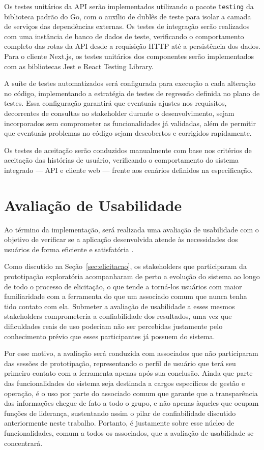 Os testes unitários da API serão implementados utilizando o pacote \texttt{testing} da biblioteca padrão do Go, com o auxílio de dublês de teste para isolar a camada de serviços das dependências externas. Os testes de integração serão realizados com uma instância de banco de dados de teste, verificando o comportamento completo das rotas da API desde a requisição HTTP até a persistência dos dados. Para o cliente Next.js, os testes unitários dos componentes serão implementados com as bibliotecas Jest e React Testing Library.

A suíte de testes automatizados será configurada para execução a cada alteração no código, implementando a estratégia de testes de regressão definida no plano de testes. Essa configuração garantirá que eventuais ajustes nos requisitos, decorrentes de consultas ao stakeholder durante o desenvolvimento, sejam incorporados sem comprometer as funcionalidades já validadas, além de permitir que eventuais problemas no código sejam descobertos e corrigidos rapidamente.

Os testes de aceitação serão conduzidos manualmente com base nos critérios de aceitação das histórias de usuário, verificando o comportamento do sistema integrado — API e cliente web — frente aos cenários definidos na especificação.


\section{Avaliação de Usabilidade}
\label{sec:usabilidade}

Ao término da implementação, será realizada uma avaliação de usabilidade com o objetivo de verificar se a aplicação desenvolvida atende às necessidades dos usuários de forma eficiente e satisfatória \cite{rubin2008handbook}.

Como discutido na Seção~\ref{sec:elicitacao}, os stakeholders que participaram da prototipação exploratória acompanharam de perto a evolução do sistema ao longo de todo o processo de elicitação, o que tende a torná-los usuários com maior familiaridade com a ferramenta do que um associado comum que nunca tenha tido contato com ela. Submeter a avaliação de usabilidade a esses mesmos stakeholders comprometeria a confiabilidade dos resultados, uma vez que dificuldades reais de uso poderiam não ser percebidas justamente pelo conhecimento prévio que esses participantes já possuem do sistema.

Por esse motivo, a avaliação será conduzida com associados que não participaram das sessões de prototipação, representando o perfil de usuário que terá seu primeiro contato com a ferramenta apenas após sua conclusão. Ainda que parte das funcionalidades do sistema seja destinada a cargos específicos de gestão e operação, é o uso por parte do associado comum que garante que a transparência das informações chegue de fato a todo o grupo, e não apenas àqueles que ocupam funções de liderança, sustentando assim o pilar de confiabilidade discutido anteriormente neste trabalho. Portanto, é justamente sobre esse núcleo de funcionalidades, comum a todos os associados, que a avaliação de usabilidade se concentrará.

